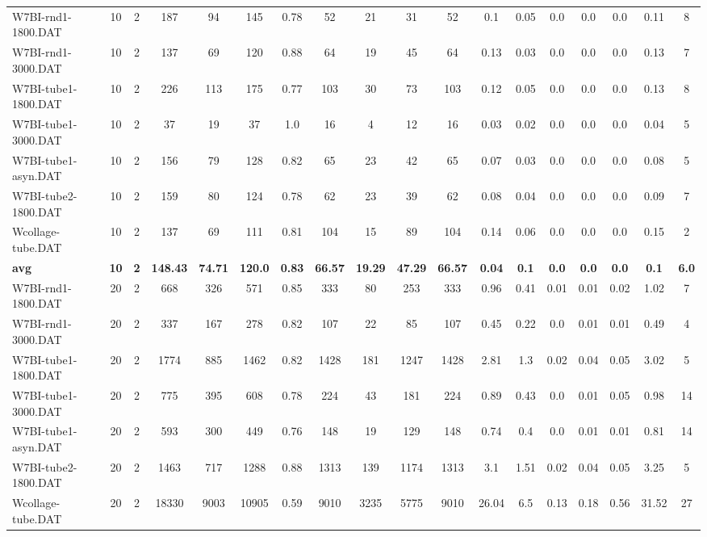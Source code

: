 \begin{sidewaystable}[h]
{\begin{tabular}{lccccccccccccccccc}
W7BI-rnd1-1800.DAT & 10 & 2 & 187 & 94 & 145 & 0.78 & 52 & 21 & 31 & 52 & 0.1 & 0.05 & 0.0 & 0.0 & 0.0 & 0.11 & 8\\
W7BI-rnd1-3000.DAT & 10 & 2 & 137 & 69 & 120 & 0.88 & 64 & 19 & 45 & 64 & 0.13 & 0.03 & 0.0 & 0.0 & 0.0 & 0.13 & 7\\
W7BI-tube1-1800.DAT & 10 & 2 & 226 & 113 & 175 & 0.77 & 103 & 30 & 73 & 103 & 0.12 & 0.05 & 0.0 & 0.0 & 0.0 & 0.13 & 8\\
W7BI-tube1-3000.DAT & 10 & 2 & 37 & 19 & 37 & 1.0 & 16 & 4 & 12 & 16 & 0.03 & 0.02 & 0.0 & 0.0 & 0.0 & 0.04 & 5\\
W7BI-tube1-asyn.DAT & 10 & 2 & 156 & 79 & 128 & 0.82 & 65 & 23 & 42 & 65 & 0.07 & 0.03 & 0.0 & 0.0 & 0.0 & 0.08 & 5\\
W7BI-tube2-1800.DAT & 10 & 2 & 159 & 80 & 124 & 0.78 & 62 & 23 & 39 & 62 & 0.08 & 0.04 & 0.0 & 0.0 & 0.0 & 0.09 & 7\\
Wcollage-tube.DAT & 10 & 2 & 137 & 69 & 111 & 0.81 & 104 & 15 & 89 & 104 & 0.14 & 0.06 & 0.0 & 0.0 & 0.0 & 0.15 & 2\\
\cline{1-18} \textbf{avg} & \textbf{10} & \textbf{2} & \textbf{148.43} & \textbf{74.71} & \textbf{120.0} & \textbf{0.83} & \textbf{66.57} & \textbf{19.29} & \textbf{47.29} & \textbf{66.57} & \textbf{0.04} & \textbf{0.1} & \textbf{0.0} & \textbf{0.0} & \textbf{0.0} & \textbf{0.1} & \textbf{6.0} \\ \cline{1-18}
W7BI-rnd1-1800.DAT & 20 & 2 & 668 & 326 & 571 & 0.85 & 333 & 80 & 253 & 333 & 0.96 & 0.41 & 0.01 & 0.01 & 0.02 & 1.02 & 7\\
W7BI-rnd1-3000.DAT & 20 & 2 & 337 & 167 & 278 & 0.82 & 107 & 22 & 85 & 107 & 0.45 & 0.22 & 0.0 & 0.01 & 0.01 & 0.49 & 4\\
W7BI-tube1-1800.DAT & 20 & 2 & 1774 & 885 & 1462 & 0.82 & 1428 & 181 & 1247 & 1428 & 2.81 & 1.3 & 0.02 & 0.04 & 0.05 & 3.02 & 5\\
W7BI-tube1-3000.DAT & 20 & 2 & 775 & 395 & 608 & 0.78 & 224 & 43 & 181 & 224 & 0.89 & 0.43 & 0.0 & 0.01 & 0.05 & 0.98 & 14\\
W7BI-tube1-asyn.DAT & 20 & 2 & 593 & 300 & 449 & 0.76 & 148 & 19 & 129 & 148 & 0.74 & 0.4 & 0.0 & 0.01 & 0.01 & 0.81 & 14\\
W7BI-tube2-1800.DAT & 20 & 2 & 1463 & 717 & 1288 & 0.88 & 1313 & 139 & 1174 & 1313 & 3.1 & 1.51 & 0.02 & 0.04 & 0.05 & 3.25 & 5\\
Wcollage-tube.DAT & 20 & 2 & 18330 & 9003 & 10905 & 0.59 & 9010 & 3235 & 5775 & 9010 & 26.04 & 6.5 & 0.13 & 0.18 & 0.56 & 31.52 & 27\\

\end{tabular}}
\end{sidewaystable}
